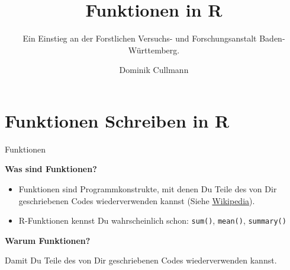 \documentclass[ignorenonframetext,]{beamer}
\title{Funktionen in \textbf{R}}
\subtitle{Ein Einstieg an der Forstlichen Versuchs- und Forschungsanstalt
Baden-Württemberg.}
\author{Dominik Cullmann}
\begin{document}
\frame{\titlepage}

\section{Funktionen Schreiben in R}\label{funktionen-schreiben-in-r}

\begin{frame}{Funktionen}

\textbf{Was sind Funktionen?}

\begin{itemize}
\itemsep1pt\parskip0pt
\item
  Funktionen sind Programmkonstrukte, mit denen Du Teile des von Dir
  geschriebenen Codes wiederverwenden kannst (Siehe
  \href{https://de.wikipedia.org/wiki/Funktion_(Programmierung)}{Wikipedia}).
\item
  R-Funktionen kennst Du wahrscheinlich schon: \texttt{sum()},
  \texttt{mean()}, \texttt{summary()}
\end{itemize}

\textbf{Warum Funktionen?}

Damit Du Teile des von Dir geschriebenen Codes wiederverwenden kannst.

\end{frame}
\end{document}
